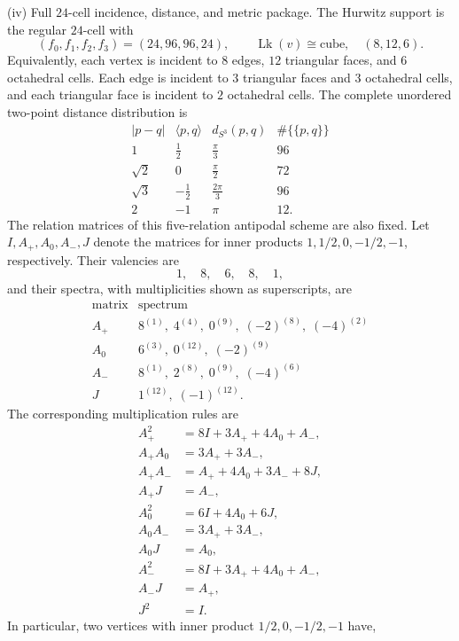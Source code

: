 \documentclass[11pt]{article}
\begin{document}
\begin{theorem}[\(m=1\) finite numerical data]
\smallskip
\noindent\textup{(iv) Full \(24\)-cell incidence, distance, and metric package.}
The Hurwitz support is the regular \(24\)-cell with
\[
    (f_0,f_1,f_2,f_3)=(24,96,96,24),
    \qquad
    \operatorname{Lk}(v)\cong\text{cube},
    \quad
    (8,12,6).
\]
Equivalently, each vertex is incident to \(8\) edges, \(12\) triangular faces,
and \(6\) octahedral cells.  Each edge is incident to \(3\) triangular faces
and \(3\) octahedral cells, and each triangular face is incident to \(2\)
octahedral cells.  The complete unordered two-point distance distribution is
\[
\begin{array}{c|c|c|c}
|p-q| & \langle p,q\rangle & d_{S^3}(p,q) & \#\{\{p,q\}\}\\
\hline
1 & \tfrac12 & \tfrac\pi3 & 96\\
\sqrt2 & 0 & \tfrac\pi2 & 72\\
\sqrt3 & -\tfrac12 & \tfrac{2\pi}{3} & 96\\
2 & -1 & \pi & 12.
\end{array}
\]
The relation matrices of this five-relation antipodal scheme are also fixed.
Let \(I,A_+,A_0,A_-,J\) denote the matrices for inner products
\(1,1/2,0,-1/2,-1\), respectively.  Their valencies are
\[
    1,\quad 8,\quad 6,\quad 8,\quad 1,
\]
and their spectra, with multiplicities shown as superscripts, are
\[
\begin{array}{c|c}
\text{matrix} & \text{spectrum}\\
\hline
A_+ & 8^{(1)},\;4^{(4)},\;0^{(9)},\;(-2)^{(8)},\;(-4)^{(2)}\\
A_0 & 6^{(3)},\;0^{(12)},\;(-2)^{(9)}\\
A_- & 8^{(1)},\;2^{(8)},\;0^{(9)},\;(-4)^{(6)}\\
J & 1^{(12)},\;(-1)^{(12)}.
\end{array}
\]
The corresponding multiplication rules are
\[
\begin{aligned}
A_+^2&=8I+3A_++4A_0+A_-,\\
A_+A_0&=3A_++3A_-,\\
A_+A_-&=A_++4A_0+3A_-+8J,\\
A_+J&=A_-,\\
A_0^2&=6I+4A_0+6J,\\
A_0A_-&=3A_++3A_-,\\
A_0J&=A_0,\\
A_-^2&=8I+3A_++4A_0+A_-,\\
A_-J&=A_+,\\
J^2&=I.
\end{aligned}
\]
In particular, two vertices with inner product \(1/2,0,-1/2,-1\) have,

\end{theorem}
\end{document}
